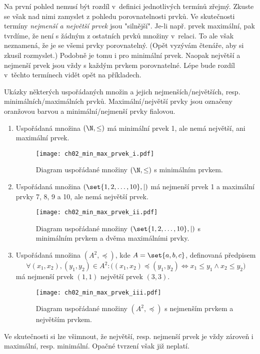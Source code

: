 Na první pohled nemusí být rozdíl v~definici jednotlivých termínů zřejmý. Zkuste se však nad nimi zamyslet z pohledu porovnatelnosti prvků. Ve skutečnosti termíny \emph{nejmenší a největší prvek} jsou "silnější". Je-li např. prvek maximální, pak tvrdíme, že není s žádným z ostatních prvků množiny v~relaci. To ale však neznamená, že je se všemi prvky porovnatelný. (Opět vyzývám čtenáře, aby si zkusil rozmyslet.) Podobně je tomu i pro minimální prvek. Naopak největší a nejmenší prvek jsou vždy s každým prvkem porovnatelné. Lépe bude rozdíl v~těchto termínech vidět opět na příkladech.
\begin{example}\label{ex:min_max_prvek}
    \sloppy Ukázky některých uspořádaných množin a jejich nejmenších/největších, resp. minimálních/maximálních prvků. Maximální/největší prvky jsou označeny oranžovou barvou a minimální/nejmenší prvky fialovou. 
    \begin{enumerate}[label=(\roman*)]
        \item\label{item:min_max_prvek_i} Uspořádaná množina $(\N,\leq)$ má minimální prvek 1, ale nemá největší, ani maximální prvek.
        \begin{figure}[H]
            \centering
            \texttt{[image: ch02\_min\_max\_prvek\_i.pdf]}
            \caption{Diagram uspořádané množiny $(\N,\leq)$ s minimálním prvkem.}
            \label{fig:min_max_prvek_i}
        \end{figure}
        \item\label{item:min_max_prvek_ii} Uspořádaná množina $(\set{1,2,\dots,10},\mid)$ má nejmenší prvek 1 a maximální prvky 7, 8, 9 a 10, ale nemá největší prvek.
        \begin{figure}[H]
            \centering
            \texttt{[image: ch02\_min\_max\_prvek\_ii.pdf]}
            \caption{Diagram uspořádané množiny $(\set{1,2,\dots,10},\mid)$ s minimálním prvkem a dvěma maximálními prvky.}
            \label{fig:min_max_prvek_ii}
        \end{figure}
        \item\label{item:min_max_prvek_iii} Uspořádaná množina $(A^2,\preceq)$, kde $A=\set{a,b,c}$, definovaná předpisem
        \begin{equation*}
            \forall (x_1,x_2),(y_1,y_2)\in A^2: \bigl((x_1,x_2)\preceq (y_1,y_2) \iff x_1\leq y_1 \land x_2\leq y_2\bigr)
        \end{equation*}
        má nejmenší prvek $(1,1)$ největší prvek $(3,3)$.
        \begin{figure}[H]
            \centering
            \texttt{[image: ch02\_min\_max\_prvek\_iii.pdf]}
            \caption{Diagram uspořádané množiny $(A^2,\preceq)$ s nejmenším prvkem a největším prvkem.}
            \label{fig:min_max_prvek_iii}
        \end{figure}
    \end{enumerate}
\end{example}
Ve skutečnosti si lze všimnout, že největší, resp. nejmenší prvek je vždy zároveň i maximální, resp. minimální. Opačné tvrzení však již neplatí.